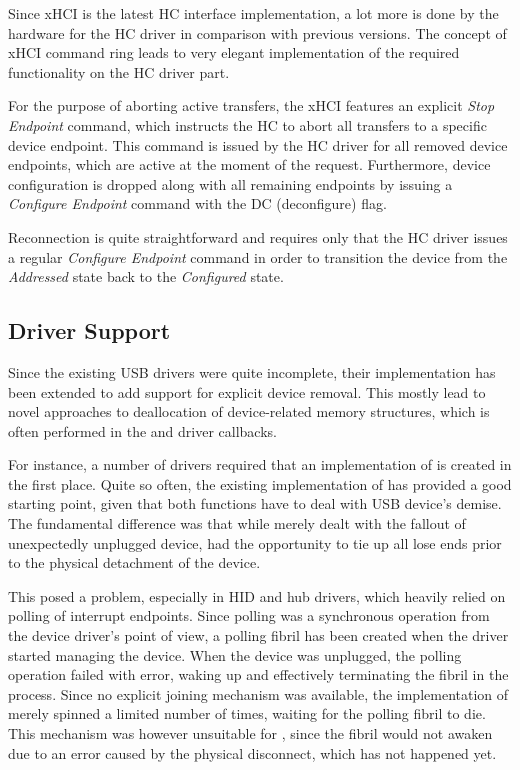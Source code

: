 Since xHCI is the latest HC interface implementation, a lot more is done by the
hardware for the HC driver in comparison with previous versions. The concept of
xHCI command ring leads to very elegant implementation of the required
functionality on the HC driver part.

For the purpose of aborting active transfers, the xHCI features an explicit
\textit{Stop Endpoint} command, which instructs the HC to abort all transfers
to a specific device endpoint. This command is issued by the HC driver for all
removed device endpoints, which are active at the moment of the request.
Furthermore, device configuration is dropped along with all remaining endpoints
by issuing a \textit{Configure Endpoint} command with the DC (deconfigure)
flag.

Reconnection is quite straightforward and requires only that the HC driver
issues a regular \textit{Configure Endpoint} command in order to transition the
device from the \textit{Addressed} state back to the \textit{Configured} state.


\subsection{Driver Support}

Since the existing USB drivers were quite incomplete, their implementation has
been extended to add support for explicit device removal. This mostly lead to
novel approaches to deallocation of device-related memory structures, which is
often performed in the  and  driver
callbacks.

For instance, a number of drivers required that an implementation of
 is created in the first place. Quite so often, the
existing implementation of  has provided a good starting
point, given that both functions have to deal with USB device's demise. The
fundamental difference was that while  merely dealt with
the fallout of unexpectedly unplugged device,  had the
opportunity to tie up all lose ends prior to the physical detachment of the
device.

This posed a problem, especially in HID and hub drivers, which heavily relied on
polling of interrupt endpoints. Since polling was a synchronous operation from
the device driver's point of view, a polling fibril has been created when the
driver started managing the device. When the device was unplugged, the polling
operation failed with error, waking up and effectively terminating the fibril in
the process. Since no explicit joining mechanism was available, the
implementation of  merely spinned a limited number of times,
waiting for the polling fibril to die. This mechanism was however unsuitable for
, since the fibril would not awaken due to an error caused
by the physical disconnect, which has not happened yet.

